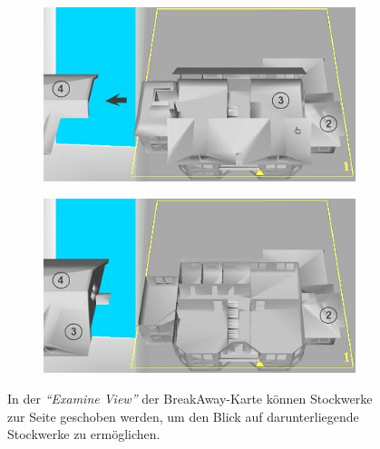 \begin{figure}
    \begin{subfigure}{.49\textwidth}
        \includegraphics[width=\textwidth]{figures/chittaro2005_breakaway_a.png}
    \end{subfigure}
    \hfill
    \begin{subfigure}{.49\textwidth}
        \includegraphics[width=\textwidth]{figures/chittaro2005_breakaway_b.png}
    \end{subfigure}
    \caption{In der \emph{\enquote{Examine View}} der BreakAway-Karte können Stockwerke zur Seite geschoben werden, um den Blick auf darunterliegende Stockwerke zu ermöglichen. }
    \label{fig:chittaro2005_breakaway}
\end{figure}

